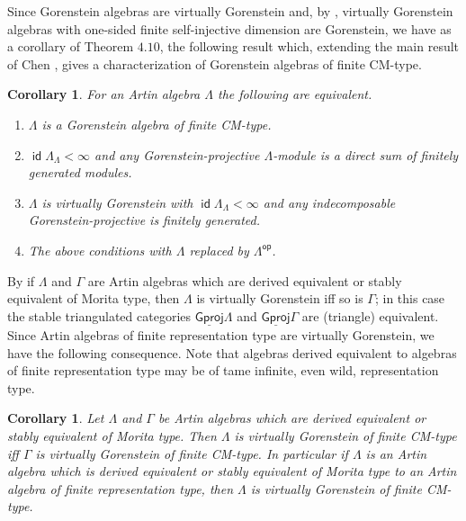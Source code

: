 \documentclass[oneside, a4paper,reqno]{amsart}
\numberwithin{equation}{section}
\newtheorem{cor}[thm]{Corollary}
\theoremstyle{definition}
\begin{document}
Since Gorenstein algebras are virtually Gorenstein and, by
\cite[Theorem 11.4]{B:cm}, virtually Gorenstein algebras with
one-sided finite self-injective dimension are Gorenstein, we have as
a corollary of Theorem $4.10$, the following result which,
extending the main result of Chen \cite[Main Theorem]{Chen}, gives a
characterization of Gorenstein algebras of finite CM-type.

\begin{cor} For an Artin algebra  $\Lambda$ the following are equivalent.
\begin{enumerate}
\item $\Lambda$ is a Gorenstein algebra of finite CM-type.
\item $\operatorname*{\mathsf{id}}\Lambda_{\Lambda} < \infty$ and any Gorenstein-projective $\Lambda$-module is a direct sum
of finitely generated modules.
\item $\Lambda$ is virtually Gorenstein with $\operatorname*{\mathsf{id}} \Lambda_{\Lambda} < \infty$ and any indecomposable
Gorenstein-projective is finitely generated.
\item The above conditions with $\Lambda$ replaced by
$\Lambda^\operatorname*{\mathsf{op}}$.
\end{enumerate}
\end{cor}

By \cite{B:cm} if $\Lambda$ and $\Gamma$ are Artin algebras which
are derived equivalent or stably equivalent of Morita type, then
$\Lambda$ is virtually Gorenstein iff so is $\Gamma$; in this case
the stable triangulated categories ${\operatorname{\underline{\mathsf{Gproj}}}\nolimits}\Lambda$ and
${\operatorname{\underline{\mathsf{Gproj}}}\nolimits}\Gamma$ are (triangle) equivalent. Since Artin algebras of
finite representation type are virtually Gorenstein, we have the
following consequence. Note that algebras derived equivalent to
algebras of finite representation type may be of tame infinite, even
wild, representation type.

\begin{cor} Let $\Lambda$ and $\Gamma$ be Artin algebras which are derived equivalent or stably equivalent of Morita type.
Then $\Lambda$ is virtually Gorenstein of finite CM-type iff
$\Gamma$ is virtually Gorenstein of finite CM-type. In particular if
$\Lambda$ is an Artin algebra which is derived equivalent or stably
equivalent of Morita type to an Artin algebra of finite
representation type, then $\Lambda$ is virtually Gorenstein of
finite CM-type.
\end{cor}
\end{document}
